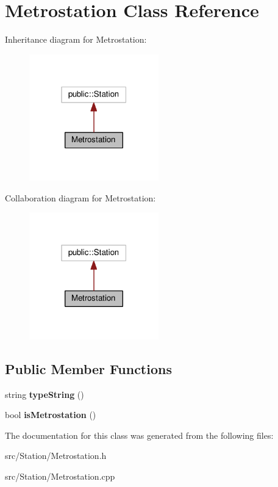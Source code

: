 \hypertarget{classMetrostation}{}\section{Metrostation Class Reference}
\label{classMetrostation}


Inheritance diagram for Metrostation\+:\nopagebreak
\begin{figure}[H]
\begin{center}
\leavevmode
\includegraphics[width=159pt]{classMetrostation__inherit__graph}
\end{center}
\end{figure}


Collaboration diagram for Metrostation\+:\nopagebreak
\begin{figure}[H]
\begin{center}
\leavevmode
\includegraphics[width=159pt]{classMetrostation__coll__graph}
\end{center}
\end{figure}
\subsection*{Public Member Functions}
\begin{DoxyCompactItemize}
\item 
string {\bfseries type\+String} ()\hypertarget{classMetrostation_afc130023eefd0a8360358607b0d807d7}{}\label{classMetrostation_afc130023eefd0a8360358607b0d807d7}

\item 
bool {\bfseries is\+Metrostation} ()\hypertarget{classMetrostation_a5086b119e97721b2a82919f612788c4e}{}\label{classMetrostation_a5086b119e97721b2a82919f612788c4e}

\end{DoxyCompactItemize}


The documentation for this class was generated from the following files\+:\begin{DoxyCompactItemize}
\item 
src/\+Station/Metrostation.\+h\item 
src/\+Station/Metrostation.\+cpp\end{DoxyCompactItemize}
